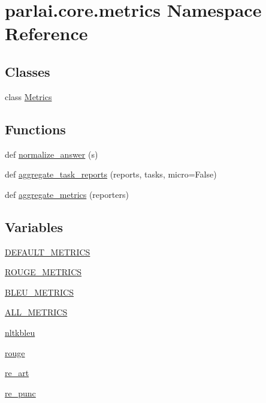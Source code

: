 \hypertarget{namespaceparlai_1_1core_1_1metrics}{}\section{parlai.\+core.\+metrics Namespace Reference}
\label{namespaceparlai_1_1core_1_1metrics}
\subsection*{Classes}
\begin{DoxyCompactItemize}
\item 
class \hyperlink{classparlai_1_1core_1_1metrics_1_1Metrics}{Metrics}
\end{DoxyCompactItemize}
\subsection*{Functions}
\begin{DoxyCompactItemize}
\item 
def \hyperlink{namespaceparlai_1_1core_1_1metrics_ae7769a6b628f41081e0f43043d52031a}{normalize\+\_\+answer} (s)
\item 
def \hyperlink{namespaceparlai_1_1core_1_1metrics_ae323045c05ed03d93c260521ebb8bf71}{aggregate\+\_\+task\+\_\+reports} (reports, tasks, micro=False)
\item 
def \hyperlink{namespaceparlai_1_1core_1_1metrics_aa4ed5491962e06684b235fffe1b20fec}{aggregate\+\_\+metrics} (reporters)
\end{DoxyCompactItemize}
\subsection*{Variables}
\begin{DoxyCompactItemize}
\item 
\hyperlink{namespaceparlai_1_1core_1_1metrics_acc206bdb7443e401c743060fbf15d196}{D\+E\+F\+A\+U\+L\+T\+\_\+\+M\+E\+T\+R\+I\+CS}
\item 
\hyperlink{namespaceparlai_1_1core_1_1metrics_a5abc2e790f53e65e2611b446f07499c3}{R\+O\+U\+G\+E\+\_\+\+M\+E\+T\+R\+I\+CS}
\item 
\hyperlink{namespaceparlai_1_1core_1_1metrics_aee21287facfcf427ee5aeca0fc55e4f7}{B\+L\+E\+U\+\_\+\+M\+E\+T\+R\+I\+CS}
\item 
\hyperlink{namespaceparlai_1_1core_1_1metrics_a1b3ded2e138cd54dd991782e24c29a13}{A\+L\+L\+\_\+\+M\+E\+T\+R\+I\+CS}
\item 
\hyperlink{namespaceparlai_1_1core_1_1metrics_aae1295106c31b93af8fbe0da66ebe000}{nltkbleu}
\item 
\hyperlink{namespaceparlai_1_1core_1_1metrics_ae0fddd2325f5dc52b2a367e52056242a}{rouge}
\item 
\hyperlink{namespaceparlai_1_1core_1_1metrics_a037f8e3330e87d9de75fac930eac7fc2}{re\+\_\+art}
\item 
\hyperlink{namespaceparlai_1_1core_1_1metrics_a334cb58cda231eb62dea1fd375f8d687}{re\+\_\+punc}
\end{DoxyCompactItemize}


